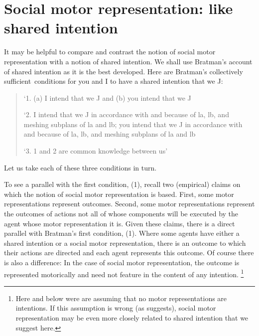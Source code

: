 \documentclass[12pt,\papersize]{extarticle}
\begin{document}
\section{Social motor representation: like shared intention}
It may be helpful to compare and contrast the notion of social motor representation with a notion of shared intention. 
We shall use Bratman's account of shared intention as it is the best developed. 
Here are Bratman’s collectively sufficient\footnotemark \ conditions for you and I to have a shared intention that we J:
%
%
\begin{quote}
\label{quote:bratman_account}
`1. (a) I intend that we J and (b) you intend that we J
 
`2. I intend that we J in accordance with and because of la, lb, and meshing subplans of la and lb; you intend that we J in accordance with and because of la, lb, and meshing subplans of la and lb
 
`3. 1 and 2 are common knowledge between us' \citep[][p.\ View 4]{Bratman:1993je}
\end{quote}
%
Let us take each of these three conditions in turn.

To see a parallel with the first condition, (1), recall two (empirical) claims on which the notion of social motor representation is based.
First, some motor representations represent outcomes.
Second, some motor representations represent the outcomes of actions not all of whose components will be executed by the agent whose motor representation it is.
Given these claims, there is a direct parallel with Bratman's first condition, (1).
Where some agents have either a shared intention or a social motor representation, there is an outcome to which their actions are directed and each agent represents this outcome.
Of course there is also a difference: In the case of social motor representation, the outcome is represented motorically and need not feature in the content of any intention.%
\footnote{
Here and below were are assuming that no motor representations are intentions. 
If this assumption is wrong (as \citealp{pacherie:2008_action} suggests), social motor representation may be even more closely related to shared intention that we suggest here.
}
\end{document}
